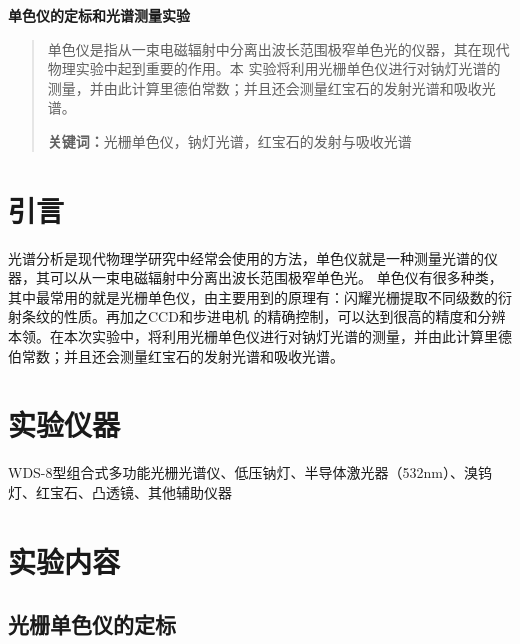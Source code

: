 \documentclass[a4paper,UTF8]{ctexart}
\begin{document}
\begin{center}
    \textbf{\Large 单色仪的定标和光谱测量实验}
    \par {}
\end{center}

\begin{abstract}
    单色仪是指从一束电磁辐射中分离出波长范围极窄单色光的仪器，其在现代物理实验中起到重要的作用。本
    实验将利用光栅单色仪进行对钠灯光谱的测量，并由此计算里德伯常数；并且还会测量红宝石的发射光谱和吸收光谱。
    \par\textbf{关键词：}光栅单色仪，钠灯光谱，红宝石的发射与吸收光谱
\end{abstract}

\section{引言}
    光谱分析是现代物理学研究中经常会使用的方法，单色仪就是一种测量光谱的仪器，其可以从一束电磁辐射中分离出波长范围极窄单色光。
    单色仪有很多种类，其中最常用的就是光栅单色仪，由主要用到的原理有：闪耀光栅提取不同级数的衍射条纹的性质。再加之CCD和步进电机
    的精确控制，可以达到很高的精度和分辨本领。在本次实验中，将利用光栅单色仪进行对钠灯光谱的测量，并由此计算里德伯常数；并且还会测量红宝石的发射光谱和吸收光谱。
\section{实验仪器}

WDS-8型组合式多功能光栅光谱仪、低压钠灯、半导体激光器（532nm）、溴钨灯、红宝石、凸透镜、其他辅助仪器

\section{实验内容}

\subsection{光栅单色仪的定标}
\end{document}
